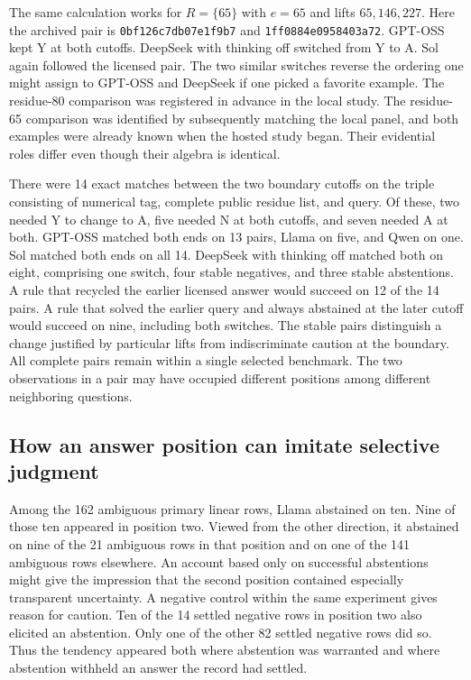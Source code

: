 \documentclass[12pt,letterpaper]{article}
\begin{document}
The same calculation works for $R=\{65\}$ with $e=65$ and lifts $65,146,227$. Here the archived pair is \texttt{0bf126c7db07e1f9b7} and \texttt{1ff0884e0958403a72}. GPT-OSS kept Y at both cutoffs. DeepSeek with thinking off switched from Y to A. Sol again followed the licensed pair. The two similar switches reverse the ordering one might assign to GPT-OSS and DeepSeek if one picked a favorite example. The residue-80 comparison was registered in advance in the local study. The residue-65 comparison was identified by subsequently matching the local panel, and both examples were already known when the hosted study began. Their evidential roles differ even though their algebra is identical.

There were 14 exact matches between the two boundary cutoffs on the triple consisting of numerical tag, complete public residue list, and query. Of these, two needed Y to change to A, five needed N at both cutoffs, and seven needed A at both. GPT-OSS matched both ends on 13 pairs, Llama on five, and Qwen on one. Sol matched both ends on all 14. DeepSeek with thinking off matched both on eight, comprising one switch, four stable negatives, and three stable abstentions. A rule that recycled the earlier licensed answer would succeed on 12 of the 14 pairs. A rule that solved the earlier query and always abstained at the later cutoff would succeed on nine, including both switches. The stable pairs distinguish a change justified by particular lifts from indiscriminate caution at the boundary. All complete pairs remain within a single selected benchmark. The two observations in a pair may have occupied different positions among different neighboring questions.

\subsection{How an answer position can imitate selective judgment}

Among the 162 ambiguous primary linear rows, Llama abstained on ten. Nine of those ten appeared in position two. Viewed from the other direction, it abstained on nine of the 21 ambiguous rows in that position and on one of the 141 ambiguous rows elsewhere. An account based only on successful abstentions might give the impression that the second position contained especially transparent uncertainty. A negative control within the same experiment gives reason for caution. Ten of the 14 settled negative rows in position two also elicited an abstention. Only one of the other 82 settled negative rows did so. Thus the tendency appeared both where abstention was warranted and where abstention withheld an answer the record had settled.
\end{document}

